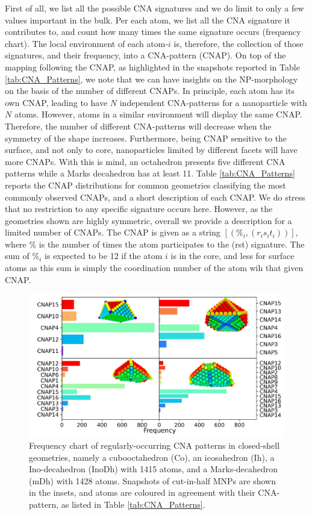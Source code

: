 First of all, we list all the possible CNA signatures and we do limit to only a few values important in the bulk.
Per each atom, we list all the CNA signature it contributes to, and count how many times the same signature occurs (frequency chart).
The local environment of each atom-$i$ is, therefore, the collection of those signatures, and their frequency, into a CNA-pattern (CNAP). On top of the mapping following the CNAP, as highlighted in the snapshots reported in Table \ref{tab:CNA_Patterns}, we note that we can have insights on the NP-morphology on the basis of the number of different CNAPs.
%
In principle, each atom has its own CNAP, leading to have $N$ independent CNA-patterns for a nanoparticle with $N$ atoms. However, atoms in a similar environment will display the same CNAP. Therefore, the number of different CNA-patterns will decrease when the symmetry of the shape increases. Furthermore, being CNAP sensitive to the surface, and not only to core, nanoparticles limited by different facets will have more CNAPs. With this is mind, an octahedron presents five different CNA patterns while a Marks decahedron has at least 11. 
%
Table \ref{tab:CNA_Patterns} reports the CNAP distributions for common geometries classifying the most commonly observed CNAPs, and a short description of each CNAP. We do stress that no restriction to any specific signature occurs here. However, as the geometries shown are highly symmetric, overall we provide a description for a limited number of CNAPs. The CNAP is given as a string $[(\%_i,(r_is_it_i))]$, where $\%$ is the number of times the atom participates to the (rst) signature. The sum of $\%_i$ is expected to be 12 if the atom $i$ is in the core, and less for surface atoms as this sum is simply the coordination number of the atom wih that given CNAP.
%
\begin{figure}[ht!]
    \centering
    \includegraphics[width=14cm]{figures/Sapphire/CNA_Pats.pdf}
    \caption{Frequency chart of regularly-occurring CNA patterns in closed-shell geometries, namely a cubooctahedron (Co), an icosahedron (Ih), a Ino-decahedron (InoDh) with 1415 atoms, and a Marks-decahedron (mDh) with 1428 atoms. Snapshots of cut-in-half MNPs are shown in the insets, and atoms are coloured in agreement with their CNA-pattern, as listed in Table \ref{tab:CNA_Patterns}. }
    \label{fig:CNA_Patterns}
\end{figure}

